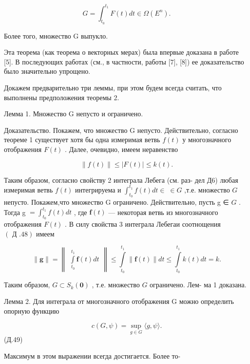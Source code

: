 \documentclass[8pt]{extarticle}
\begin{document}
\[
G = {\int }_{{t}_{0}}^{{t}_{1}}F\left( t\right) {dt} \in  \Omega \left( {E}^{n}\right) .
\]

Более того, множество G выпукло.

Эта теорема (как теорема о векторных мерах) была впервые доказана в работе [5]. В последующих работах (см., в частности, работы [7], [8]) ее доказательство было значительно упрощено.

Докажем предварительно три леммы, при этом будем всегда считать, что выполнены предположения теоремы 2.

Лемма 1. Множество G непусто и ограничено.

Доказательство. Покажем, что множество G непусто. Действительно, согласно теореме 1 существует хотя бы одна измеримая ветвь \(f\left( t\right)\) у многозначного отображения \(F\left( t\right)\) . Далее, очевидно, имеем неравенство

\[
\parallel f\left( t\right) \parallel  \leq  \left| {F\left( t\right) }\right|  \leq  k\left( t\right) . \tag{II.48}
\]

Таким образом, согласно свойству 2 интеграла Лебега (см. раз- дел Д6) любая измеримая ветвь \(f\left( t\right)\) интегрируема и \({\int }_{{t}_{0}}^{{t}_{1}}f\left( t\right) {dt} \in \; \in  G\) ,т.е. множество \(G\) непусто. Покажем,что множество G ограничено. Действительно, пусть g ∈ \(G\) . Тогда g \(= {\int }_{{t}_{0}}^{{t}_{1}}f\left( t\right) {dt}\) , где \(\mathbf{f}\left( t\right)\) — некоторая ветвь из многозначного отображения \(F\left( t\right)\) . В силу свойства 3 интеграла Лебегаи соотнощения \(\left( {\text{ Д }.48}\right)\) имеем

\[
\parallel \mathbf{g}\parallel  = \left\lVert \begin{array}{c} {\mathop{\int }\limits_{{t}_{0}}^{{t}_{1}}\mathbf{f}\left( t\right) {dt}} \end{array} \right\rVert \leq  \mathop{\int }\limits_{{t}_{0}}^{{t}_{1}}\parallel \mathbf{f}\left( t\right) \parallel {dt} \leq  \mathop{\int }\limits_{{t}_{0}}^{{t}_{1}}k\left( t\right) {dt} = k.
\]

Таким образом, \(G \subset  {S}_{k}\left( \mathbf{0}\right)\) , т.е. множество \(G\) ограничено. Лем- ма 1 доказана.

Лемма 2. Для интеграла от многозначного отображения G можно определить опорную функцию

\[
c\left( {G,\psi }\right)  = \mathop{\sup }\limits_{{g \in  G}}\langle g,\psi \rangle .
\]
 (Д.49)

Максимум в этом выражении всегда достигается. Более то-
\end{document}
